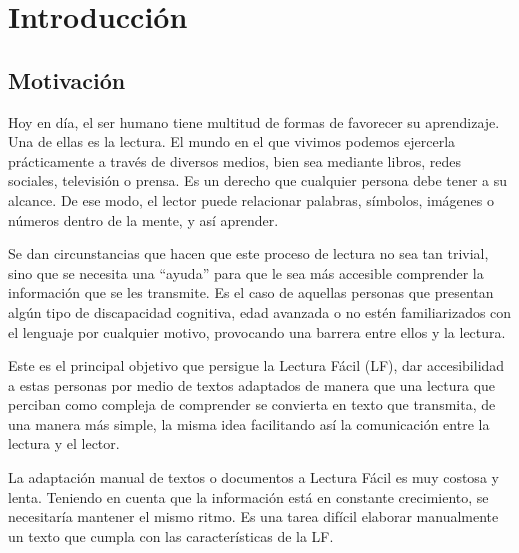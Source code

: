 \chapter{Introducción}
\label{cap:introduccion}


\section{Motivación}
Hoy en día, el ser humano tiene multitud de formas de favorecer su aprendizaje. Una de ellas es la lectura. El mundo en el que vivimos podemos ejercerla prácticamente a través de diversos medios, bien sea mediante libros, redes sociales, televisión o prensa. Es un derecho que cualquier persona debe tener a su alcance. De ese modo, el lector puede relacionar palabras, símbolos, imágenes o números dentro de la mente, y así aprender.


 \setlength{\parskip}{10pt}

 Se dan circunstancias que hacen que este proceso de lectura no sea tan trivial, sino que se necesita una ``ayuda'' para que le sea más accesible comprender la información que se les transmite. Es el caso de aquellas personas que presentan algún tipo de discapacidad cognitiva, edad avanzada o no estén familiarizados con el lenguaje por cualquier motivo, provocando una barrera entre ellos y la lectura.
 
  Este es el principal objetivo que persigue la Lectura Fácil (LF), dar accesibilidad a estas personas por medio de textos adaptados de manera que una lectura que perciban como compleja de comprender se convierta en texto que transmita, de una manera más simple, la misma idea facilitando así la comunicación entre la lectura y el lector.
 
 \setlength{\parskip}{10pt}
 

La adaptación manual de textos o documentos a Lectura Fácil es muy costosa y lenta. Teniendo en cuenta que la información está en constante crecimiento, se necesitaría mantener el mismo ritmo. Es una tarea difícil elaborar manualmente un texto que cumpla con las características de la LF. 
 

